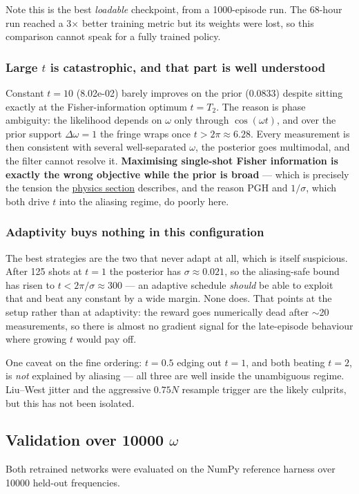 \documentclass[12pt,a4paper]{article}
\begin{document}
Note this is the best \emph{loadable} checkpoint, from a 1000-episode run. The 68-hour run reached a 3$\times$ better training metric but its weights were lost, so this comparison cannot speak for a fully trained policy.

\subsubsection{Large $t$ is catastrophic, and that part is well understood}\label{sec:large-t-is-catastrophic}
Constant $t = 10$ (8.02e-02) barely improves on the prior (0.0833) despite sitting exactly at the Fisher-information optimum $t = T_2$. The reason is phase ambiguity: the likelihood depends on $\omega$ only through $\cos(\omega t)$, and over the prior support $\Delta\omega = 1$ the fringe wraps once $t > 2\pi \approx 6.28$. Every measurement is then consistent with several well-separated $\omega$, the posterior goes multimodal, and the filter cannot resolve it. \textbf{Maximising single-shot Fisher information is exactly the wrong objective while the prior is broad} --- which is precisely the tension the \hyperref[sec:the-competing-constraint-phase-ambiguity]{physics section} describes, and the reason PGH and $1/\sigma$, which both drive $t$ into the aliasing regime, do poorly here.

\subsubsection{Adaptivity buys nothing in this configuration}\label{sec:adaptivity-buys-nothing}
The best strategies are the two that never adapt at all, which is itself suspicious. After 125 shots at $t = 1$ the posterior has $\sigma \approx 0.021$, so the aliasing-safe bound has risen to $t < 2\pi/\sigma \approx 300$ --- an adaptive schedule \emph{should} be able to exploit that and beat any constant by a wide margin. None does. That points at the setup rather than at adaptivity: the reward goes numerically dead after $\sim$20 measurements, so there is almost no gradient signal for the late-episode behaviour where growing $t$ would pay off.

One caveat on the fine ordering: $t = 0.5$ edging out $t = 1$, and both beating $t = 2$, is \emph{not} explained by aliasing --- all three are well inside the unambiguous regime. Liu--West jitter and the aggressive $0.75N$ resample trigger are the likely culprits, but this has not been isolated.

\FloatBarrier
\subsection{Validation over \texorpdfstring{\num{10000}}{10 000} \texorpdfstring{$\omega$}{omega}}\label{sec:validation-over-10-000-omega-the-n-scripts}
Both retrained networks were evaluated on the NumPy reference harness over \num{10000} held-out frequencies.
\end{document}
